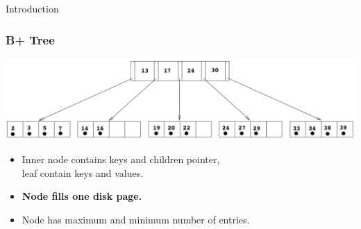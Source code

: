 \documentclass{beamer}
\begin{document}
\begin{section}{Introduction}
    \begin{frame}
      \frametitle{B+ Tree}
      \pause
      \vspace{-1em}
      \includegraphics[scale=0.2]{B+Tree.png}
      \vspace{2em}
      \begin{itemize}
        \item Inner node contains keys and children pointer, \\leaf contain keys and values.
        \pause
        \item \textbf{Node fills one disk page.}
        \pause
        \item Node has maximum and minimum number of entries.
      \end{itemize}
    \end{frame}


\end{section}
\end{document}
